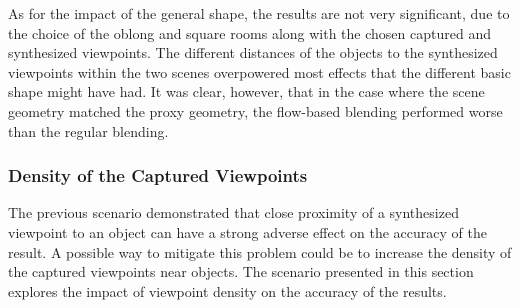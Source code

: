 As for the impact of the general shape, the results are not very significant, due to the choice of the oblong and square rooms along with the chosen captured and synthesized viewpoints. The different distances of the objects to the synthesized viewpoints within the two scenes overpowered most effects that the different basic shape might have had. It was clear, however, that in the case where the scene geometry matched the proxy geometry, the flow-based blending performed worse than the regular blending.























\subsubsection{Density of the Captured Viewpoints}
The previous scenario demonstrated that close proximity of a synthesized viewpoint to an object can have a strong adverse effect on the accuracy of the result. A possible way to mitigate this problem could be to increase the density of the captured viewpoints near objects. The scenario presented in this section explores the impact of viewpoint density on the accuracy of the results.

